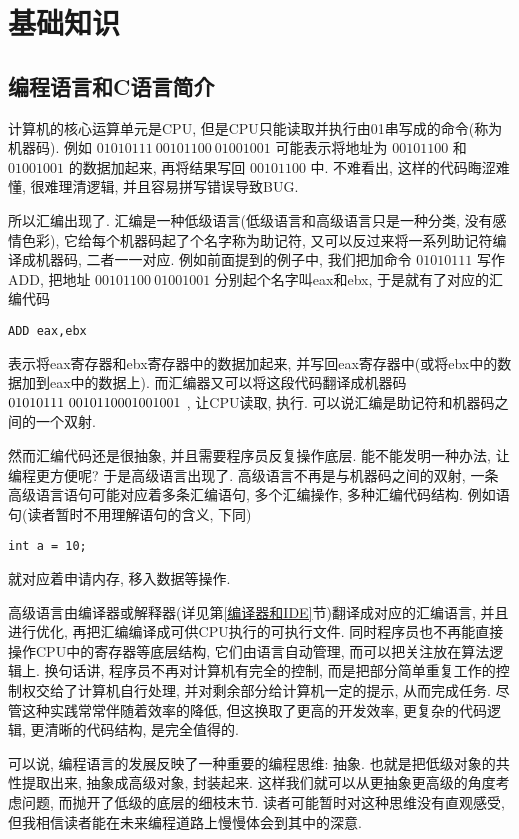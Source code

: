 \chapter{基础知识} \label{基础知识}
\fancyhead[LO]{\bfseries\leftmark}
\fancyhead[RE]{\bfseries\rightmark}
    \section{编程语言和C语言简介}
        计算机的核心运算单元是CPU, 但是CPU只能读取并执行由01串写成的命令(称为机器码). 例如 $ 01010111 \ 00101100 \ 01001001$ 可能表示将地址为 $ 00101100 $ 和 $ 01001001 $ 的数据加起来, 再将结果写回 $ 00101100 $ 中. 不难看出, 这样的代码晦涩难懂, 很难理清逻辑, 并且容易拼写错误导致BUG.

        所以汇编出现了. 汇编是一种低级语言(低级语言和高级语言只是一种分类, 没有感情色彩), 它给每个机器码起了个名字称为助记符, 又可以反过来将一系列助记符编译成机器码, 二者一一对应. 例如前面提到的例子中, 我们把加命令 $ 01010111 $ 写作ADD, 把地址 $ 00101100 \ 01001001 $ 分别起个名字叫eax和ebx, 于是就有了对应的汇编代码
\begin{lstlisting}
ADD eax,ebx
\end{lstlisting}
        表示将eax寄存器和ebx寄存器中的数据加起来, 并写回eax寄存器中(或将ebx中的数据加到eax中的数据上). 而汇编器又可以将这段代码翻译成机器码 $ 01010111 \ 00101100 \\ 01001001 $ , 让CPU读取, 执行. 可以说汇编是助记符和机器码之间的一个双射.

        然而汇编代码还是很抽象, 并且需要程序员反复操作底层. 能不能发明一种办法, 让编程更方便呢? 于是高级语言出现了. 高级语言不再是与机器码之间的双射, 一条高级语言语句可能对应着多条汇编语句, 多个汇编操作, 多种汇编代码结构. 例如语句(读者暂时不用理解语句的含义, 下同)
\begin{lstlisting}
int a = 10;
\end{lstlisting}
        就对应着申请内存, 移入数据等操作.

        高级语言由编译器或解释器(详见第\ref{编译器和IDE}节)翻译成对应的汇编语言, 并且进行优化, 再把汇编编译成可供CPU执行的可执行文件. 同时程序员也不再能直接操作CPU中的寄存器等底层结构, 它们由语言自动管理, 而可以把关注放在算法逻辑上. 换句话讲, 程序员不再对计算机有完全的控制, 而是把部分简单重复工作的控制权交给了计算机自行处理, 并对剩余部分给计算机一定的提示, 从而完成任务. 尽管这种实践常常伴随着效率的降低, 但这换取了更高的开发效率, 更复杂的代码逻辑, 更清晰的代码结构, 是完全值得的.

        可以说, 编程语言的发展反映了一种重要的编程思维: 抽象. 也就是把低级对象的共性提取出来, 抽象成高级对象, 封装起来. 这样我们就可以从更抽象更高级的角度考虑问题, 而抛开了低级的底层的细枝末节. 读者可能暂时对这种思维没有直观感受, 但我相信读者能在未来编程道路上慢慢体会到其中的深意.

